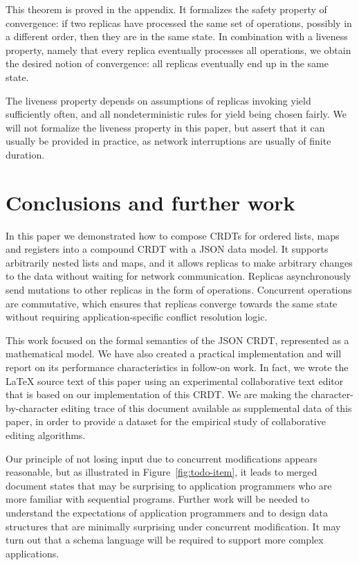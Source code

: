 \documentclass[10pt,journal,compsoc]{IEEEtran}
\begin{document}
This theorem is proved in the appendix. It formalizes the safety property of convergence: if two replicas have processed the same set of operations, possibly in a different order, then they are in the same state. In combination with a liveness property, namely that every replica eventually processes all operations, we obtain the desired notion of convergence: all replicas eventually end up in the same state.

The liveness property depends on assumptions of replicas invoking \textsf{yield} sufficiently often, and all nondeterministic rules for \textsf{yield} being chosen fairly. We will not formalize the liveness property in this paper, but assert that it can usually be provided in practice, as network interruptions are usually of finite duration.

\section{Conclusions and further work}

In this paper we demonstrated how to compose CRDTs for ordered lists, maps and registers into a compound CRDT with a JSON data model. It supports arbitrarily nested lists and maps, and it allows replicas to make arbitrary changes to the data without waiting for network communication. Replicas asynchronously send mutations to other replicas in the form of operations. Concurrent operations are commutative, which ensures that replicas converge towards the same state without requiring application-specific conflict resolution logic.

This work focused on the formal semantics of the JSON CRDT, represented as a mathematical model. We have also created a practical implementation and will report on its performance characteristics in follow-on work. In fact, we wrote the {\LaTeX} source text of this paper using an experimental collaborative text editor that is based on our implementation of this CRDT. We are making the character-by-character editing trace of this document available as supplemental data of this paper, in order to provide a dataset for the empirical study of collaborative editing algorithms.

Our principle of not losing input due to concurrent modifications appears reasonable, but as illustrated in Figure~\ref{fig:todo-item}, it leads to merged document states that may be surprising to application programmers who are more familiar with sequential programs. Further work will be needed to understand the expectations of application programmers and to design data structures that are minimally surprising under concurrent modification. It may turn out that a schema language will be required to support more complex applications.
\end{document}

